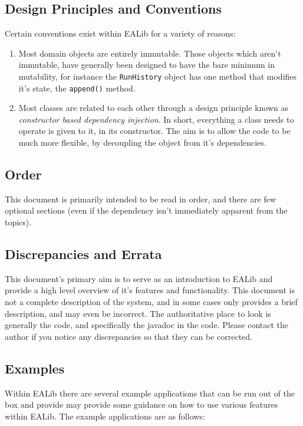 \documentclass[11pt,letterpaper,oneside]{article}
\begin{document}
\subsection{Design Principles and Conventions}
\label{sec:design-principles}
Certain conventions exist within EALib for a variety of reasons:

\begin{enumerate}

\item Most domain objects are entirely immutable. Those objects which aren't immutable, have generally been designed to have the bare minimum in mutability, for instance the \texttt{RunHistory} object has one method that modifies it's state, the \texttt{append()} method.

\item Most classes are related to each other through a design principle known as \emph{constructor based dependency injection}. In short, everything a class needs to operate is given to it, in its constructor. The aim is to allow the code to be much more flexible, by decoupling the object from it's dependencies. 

\end{enumerate}

\subsection{Order}

This document is primarily intended to be read in order, and there are few optional sections (even if the dependency isn't immediately apparent from the topics).

\subsection{Discrepancies and Errata}

This document's primary aim is to serve as an introduction to EALib and provide a high level overview of it's features and functionality. This document is not a complete description of the system, and in some cases only provides a brief description, and may even be incorrect. The authoritative place to look is generally the code, and specifically the javadoc in the code. Please contact the author if you notice any discrepancies so that they can be corrected.

\subsection{Examples}
\label{sec:examples}
Within EALib there are several example applications that can be run out of the box and provide may provide some guidance on how to use various features within EALib. The example applications are as follows:
\end{document}
